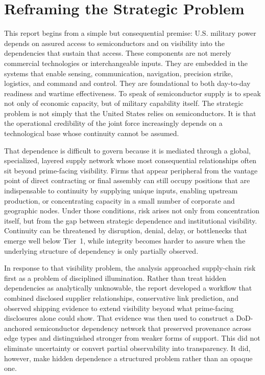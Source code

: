 \section{Reframing the Strategic Problem}
\label{sec:ch6_reframing_strategic_problem}

This report begins from a simple but consequential premise: U.S. military power depends on assured access to semiconductors and on visibility into the dependencies that sustain that access. These components are not merely commercial technologies or interchangeable inputs. They are embedded in the systems that enable sensing, communication, navigation, precision strike, logistics, and command and control. They are foundational to both day-to-day readiness and wartime effectiveness. To speak of semiconductor supply is to speak not only of economic capacity, but of military capability itself. The strategic problem is not simply that the United States relies on semiconductors. It is that the operational credibility of the joint force increasingly depends on a technological base whose continuity cannot be assumed.

That dependence is difficult to govern because it is mediated through a global, specialized, layered supply network whose most consequential relationships often sit beyond prime-facing visibility. Firms that appear peripheral from the vantage point of direct contracting or final assembly can still occupy positions that are indispensable to continuity by supplying unique inputs, enabling upstream production, or concentrating capacity in a small number of corporate and geographic nodes. Under those conditions, risk arises not only from concentration itself, but from the gap between strategic dependence and institutional visibility. Continuity can be threatened by disruption, denial, delay, or bottlenecks that emerge well below Tier~1, while integrity becomes harder to assure when the underlying structure of dependency is only partially observed.

In response to that visibility problem, the analysis approached supply-chain risk first as a problem of disciplined illumination. Rather than treat hidden dependencies as analytically unknowable, the report developed a workflow that combined disclosed supplier relationships, conservative link prediction, and observed shipping evidence to extend visibility beyond what prime-facing disclosures alone could show. That evidence was then used to construct a DoD-anchored semiconductor dependency network that preserved provenance across edge types and distinguished stronger from weaker forms of support. This did not eliminate uncertainty or convert partial observability into transparency. It did, however, make hidden dependence a structured problem rather than an opaque one.

